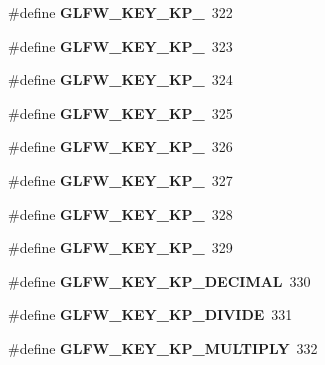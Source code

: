 \begin{DoxyCompactItemize}
\mbox{\label{group__keys_gaf82d5a802ab8213c72653d7480c16f13}} 
\#define {\bfseries G\+L\+F\+W\+\_\+\+K\+E\+Y\+\_\+\+K\+P\+\_}~322
\item 
\mbox{\label{group__keys_ga7e25ff30d56cd512828c1d4ae8d54ef2}} 
\#define {\bfseries G\+L\+F\+W\+\_\+\+K\+E\+Y\+\_\+\+K\+P\+\_}~323
\item 
\mbox{\label{group__keys_gada7ec86778b85e0b4de0beea72234aea}} 
\#define {\bfseries G\+L\+F\+W\+\_\+\+K\+E\+Y\+\_\+\+K\+P\+\_}~324
\item 
\mbox{\label{group__keys_ga9a5be274434866c51738cafbb6d26b45}} 
\#define {\bfseries G\+L\+F\+W\+\_\+\+K\+E\+Y\+\_\+\+K\+P\+\_}~325
\item 
\mbox{\label{group__keys_gafc141b0f8450519084c01092a3157faa}} 
\#define {\bfseries G\+L\+F\+W\+\_\+\+K\+E\+Y\+\_\+\+K\+P\+\_}~326
\item 
\mbox{\label{group__keys_ga8882f411f05d04ec77a9563974bbfa53}} 
\#define {\bfseries G\+L\+F\+W\+\_\+\+K\+E\+Y\+\_\+\+K\+P\+\_}~327
\item 
\mbox{\label{group__keys_gab2ea2e6a12f89d315045af520ac78cec}} 
\#define {\bfseries G\+L\+F\+W\+\_\+\+K\+E\+Y\+\_\+\+K\+P\+\_}~328
\item 
\mbox{\label{group__keys_gafb21426b630ed4fcc084868699ba74c1}} 
\#define {\bfseries G\+L\+F\+W\+\_\+\+K\+E\+Y\+\_\+\+K\+P\+\_}~329
\item 
\mbox{\label{group__keys_ga4e231d968796331a9ea0dbfb98d4005b}} 
\#define {\bfseries G\+L\+F\+W\+\_\+\+K\+E\+Y\+\_\+\+K\+P\+\_\+\+D\+E\+C\+I\+M\+AL}~330
\item 
\mbox{\label{group__keys_gabca1733780a273d549129ad0f250d1e5}} 
\#define {\bfseries G\+L\+F\+W\+\_\+\+K\+E\+Y\+\_\+\+K\+P\+\_\+\+D\+I\+V\+I\+DE}~331
\item 
\mbox{\label{group__keys_ga9ada267eb0e78ed2ada8701dd24a56ef}} 
\#define {\bfseries G\+L\+F\+W\+\_\+\+K\+E\+Y\+\_\+\+K\+P\+\_\+\+M\+U\+L\+T\+I\+P\+LY}~332

\end{DoxyCompactItemize}
